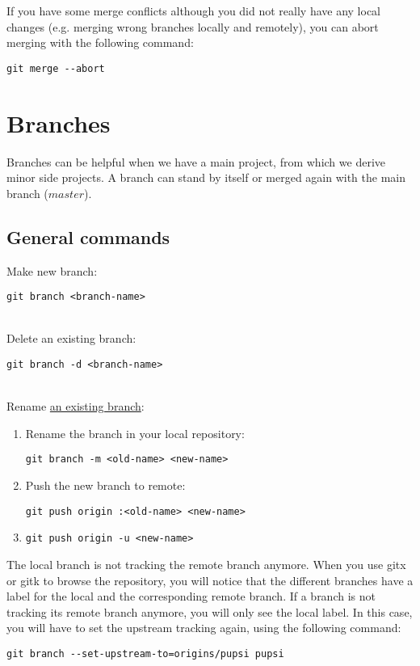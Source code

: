 \documentclass{report}
\begin{document}
If you have some merge conflicts although you did not really have any local changes (e.g. merging wrong branches locally and remotely), you can abort merging with the following command:
\begin{verbatim}
git merge --abort
\end{verbatim}

\chapter{Branches}
Branches can be helpful when we have a main project, from which we derive minor side projects. A branch can stand by itself or merged again with the main branch ($master$).

\section{General commands}

Make new branch:
\begin{verbatim}
git branch <branch-name>
\end{verbatim}
\\
Delete an existing branch:
\begin{verbatim}
git branch -d <branch-name>
\end{verbatim}
\\
Rename \href{https://multiplestates.wordpress.com/2015/02/05/rename-a-local-and-remote-branch-in-git/}{an existing branch}:
\begin{enumerate}[noitemsep]
    \item Rename the branch in your local repository:
    \begin{verbatim}
git branch -m <old-name> <new-name>
    \end{verbatim}
    \item Push the new branch to remote:
    \begin{verbatim}
git push origin :<old-name> <new-name>
    \end{verbatim}
    \item 
    \begin{verbatim}
git push origin -u <new-name>
    \end{verbatim}
\end{enumerate}

The local branch is not tracking the remote branch anymore. When you use gitx or gitk to browse the repository, you will notice that the different branches have a label for the local and the corresponding remote branch. If a branch is not tracking its remote branch anymore, you will only see the local label. In this case, you will have to set the upstream tracking again, using the following command:
\begin{verbatim}
git branch --set-upstream-to=origins/pupsi pupsi
\end{verbatim}
\end{document}
